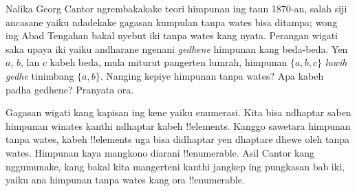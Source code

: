 \documentclass[../../../include/open-logic-section]{subfiles}
\begin{document}


Nalika Georg Cantor ngrembakakake teori himpunan ing taun 1870-an,
salah siji ancasane yaiku ndadekake gagasan kumpulan tanpa wates
bisa ditampa; wong ing Abad Tengahan bakal nyebut iki tanpa wates kang nyata.
Perangan wigati saka upaya iki yaiku andharane ngenani \emph{gedhene}
himpunan kang beda-beda. Yen $a$, $b$, lan $c$ kabeh beda,
mula miturut pangerten lumrah, himpunan $\{a, b, c\}$ \emph{luwih gedhe}
tinimbang $\{a, b\}$. Nanging kepiye himpunan tanpa wates?
Apa kabeh padha gedhene? Pranyata ora.

Gagasan wigati kang kapisan ing kene yaiku enumerasi.
Kita bisa ndhaptar saben himpunan winates kanthi ndhaptar kabeh !!{element}s.
Kanggo sawetara himpunan tanpa wates, kabeh !!{element}s uga bisa
didhaptar yen dhaptare dhewe oleh tanpa wates.
Himpunan kaya mangkono diarani !!{enumerable}.
Asil Cantor kang nggumunake, kang bakal kita mangerteni kanthi jangkep
ing pungkasan bab iki, yaiku ana himpunan tanpa wates kang ora !!{enumerable}.
\end{document}
